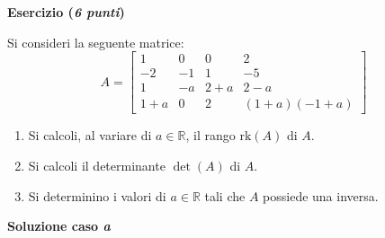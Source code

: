 \documentclass[a4paper]{article}
\begin{document}
	\textcolor{Red3}{\textbf{Esercizio (\emph{6 punti})}}\newline
	
	\noindent
	Si consideri la seguente matrice:
	\begin{equation*}
		A = \begin{bmatrix}
			1 & 0 & 0 & 2 \\
			-2 & -1 & 1 & -5 \\
			1 & -a & 2+a & 2-a \\
			1+a & 0 & 2 & \left(1+a\right)\left(-1+a\right)
		\end{bmatrix}
	\end{equation*}
	\begin{enumerate}[label=(\alph*)]
		\item Si calcoli, al variare di $a \in \mathbb{R}$, il rango $\mathrm{rk}\left(A\right)$ di $A$.
		\item Si calcoli il determinante $\det\left(A\right)$ di $A$.
		\item Si determinino i valori di $a \in \mathbb{R}$ tali che $A$ possiede una inversa.
	\end{enumerate}
	
	\noindent
	\textcolor{Green4}{\textbf{Soluzione caso \emph{a}}}\newline
	
\end{document}
